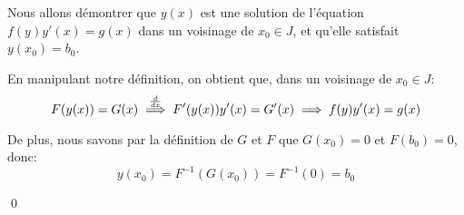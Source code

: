 \documentclass[a4paper]{article}
\begin{document}
{{        Nous allons démontrer que $y\left(x\right)$ est une solution de l'équation $f\left(y\right) y'\left(x\right) = g\left(x\right)$ dans un voisinage de $x_0 \in J$, et qu'elle satisfait $y\left(x_0\right) = b_0$.

        En manipulant notre définition, on obtient que, dans un voisinage de $x_0 \in J$:
        \[F\left(y\left(x\right)\right) = G\left(x\right) \over{\implies}{$\frac{d}{dx}$}  F'\left(y\left(x\right)\right) y'\left(x\right) = G'\left(x\right) \implies f\left(y\right)y'\left(x\right) =  g\left(x\right)\]

        De plus, nous savons par la définition de $G$ et $F$ que $G\left(x_0\right) = 0$ et $F\left(b_0\right) = 0$, donc:
        \[y\left(x_0\right) = F^{-1}\left(G\left(x_0\right)\right) = F^{-1}\left(0\right) = b_0\]

        \qed
    }

}
\end{document}
